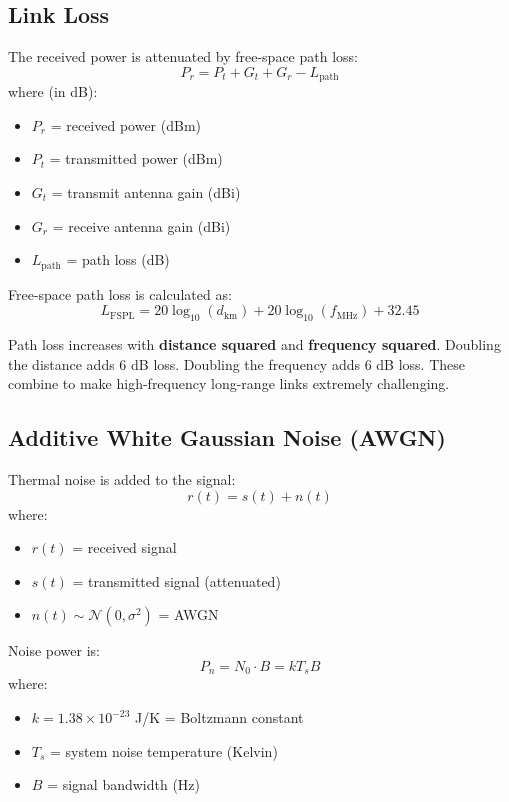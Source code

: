 \subsection{Link Loss}

The received power is attenuated by free-space path loss:
\begin{equation}
P_r = P_t + G_t + G_r - L_{\mathrm{path}}
\end{equation}
where (in dB):
\begin{itemize}
\item $P_r$ = received power (dBm)
\item $P_t$ = transmitted power (dBm)
\item $G_t$ = transmit antenna gain (dBi)
\item $G_r$ = receive antenna gain (dBi)
\item $L_{\mathrm{path}}$ = path loss (dB)
\end{itemize}

Free-space path loss is calculated as:
\begin{equation}
L_{\mathrm{FSPL}} = 20\log_{10}(d_{\mathrm{km}}) + 20\log_{10}(f_{\mathrm{MHz}}) + 32.45
\end{equation}

\begin{warningbox}
Path loss increases with \textbf{distance squared} and \textbf{frequency squared}. Doubling the distance adds 6 dB loss. Doubling the frequency adds 6 dB loss. These combine to make high-frequency long-range links extremely challenging.
\end{warningbox}

\subsection{Additive White Gaussian Noise (AWGN)}

Thermal noise is added to the signal:
\begin{equation}
r(t) = s(t) + n(t)
\end{equation}
where:
\begin{itemize}
\item $r(t)$ = received signal
\item $s(t)$ = transmitted signal (attenuated)
\item $n(t) \sim \mathcal{N}(0, \sigma^2)$ = AWGN
\end{itemize}

Noise power is:
\begin{equation}
P_n = N_0 \cdot B = kT_s B
\end{equation}
where:
\begin{itemize}
\item $k = 1.38 \times 10^{-23}$ J/K = Boltzmann constant
\item $T_s$ = system noise temperature (Kelvin)
\item $B$ = signal bandwidth (Hz)
\end{itemize}


